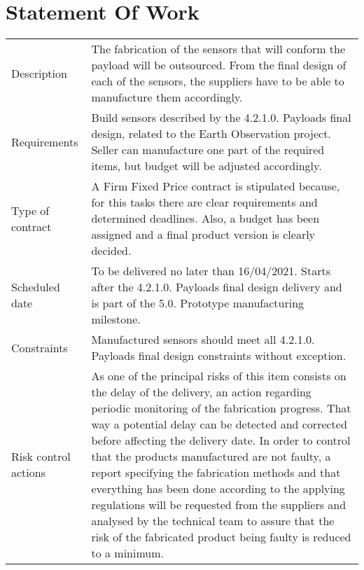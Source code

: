 \section{Statement Of Work}

\begin{table}[H]
	\centering
	\begin{tabular}
		{>{\raggedright\arraybackslash}p{3cm} >{\arraybackslash}p{11cm}}
		
		\toprule[2pt]
		
		\multicolumn{2}{c}{\textbf{SOW - 5.1.1. Manufacturing of payload sensors}}\\
		
		\midrule[1.5pt]
		
		Description & The fabrication of the sensors that will conform the payload will be outsourced. From the final design of each of the sensors, the suppliers have to be able to manufacture them accordingly. \\
		\hline
		
		Requirements & Build sensors described by the 4.2.1.0. Payloads final design, related to the Earth Observation project. Seller can manufacture one part of the required items, but budget will be adjusted accordingly.\\
		\hline
		
		Type of contract & A Firm Fixed Price contract is stipulated because, for this tasks there are clear requirements and determined deadlines. Also, a budget has been assigned and a final product version is clearly decided.\\
		\hline
		
		Scheduled date & To be delivered no later than 16/04/2021. Starts after the 4.2.1.0. Payloads final design delivery and is part of the 5.0. Prototype manufacturing milestone.\\
		\hline
		
		Constraints & Manufactured sensors should meet all 4.2.1.0. Payloads final design constraints without exception.\\
		\hline
		
		Risk control actions & As one of the principal risks of this item consists on the delay of the delivery, an action regarding periodic monitoring of the fabrication progress. That way a potential delay can be detected and corrected before affecting the delivery date.
		In order to control that the products manufactured are not faulty, a report specifying the fabrication methods and that everything has been done according to the applying regulations will be requested from the suppliers and analysed by the technical team to assure that the risk of the fabricated product being faulty is reduced to a minimum.\\
		\hline
		

\end{tabular}
\end{table}
